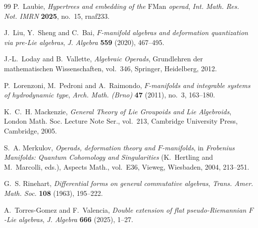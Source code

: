 \documentclass[12pt,reqno]{amsart}
\theoremstyle{definition}
\theoremstyle{remark}
\begin{document}
\begin{thebibliography}{99}
		P.~Laubie,
		\emph{Hypertrees and embedding of the $\mathrm{FMan}$ operad},
		\emph{Int. Math. Res. Not. IMRN} \textbf{2025}, no.~15, rnaf233.
		
		J.~Liu, Y.~Sheng and C.~Bai,
		\emph{$F$-manifold algebras and deformation quantization via pre-Lie
			algebras},
		\emph{J. Algebra} \textbf{559} (2020), 467--495.
		
		J.-L.~Loday and B.~Vallette,
		\emph{Algebraic Operads},
		Grundlehren der mathematischen Wissenschaften, vol.~346,
		Springer, Heidelberg, 2012.
		
		P.~Lorenzoni, M.~Pedroni and A.~Raimondo,
		\emph{$F$-manifolds and integrable systems of hydrodynamic type},
		\emph{Arch. Math. (Brno)} \textbf{47} (2011), no.~3, 163--180.
		
		K.~C.~H. Mackenzie,
		\emph{General Theory of Lie Groupoids and Lie Algebroids},
		London Math. Soc. Lecture Note Ser., vol.~213,
		Cambridge University Press, Cambridge, 2005.
		
		S.~A. Merkulov,
		\emph{Operads, deformation theory and $F$-manifolds},
		in \emph{Frobenius Manifolds: Quantum Cohomology and Singularities}
		(K.~Hertling and M.~Marcolli, eds.), Aspects Math., vol.~E36,
		Vieweg, Wiesbaden, 2004, 213--251.
		
		G.~S. Rinehart,
		\emph{Differential forms on general commutative algebras},
		\emph{Trans. Amer. Math. Soc.} \textbf{108} (1963), 195--222.
		
		A.~Torres-Gomez and F.~Valencia,
		\emph{Double extension of flat pseudo-Riemannian $F$-Lie algebras},
		\emph{J. Algebra} \textbf{666} (2025), 1--27.
		
	\end{thebibliography}
	
\end{document}
